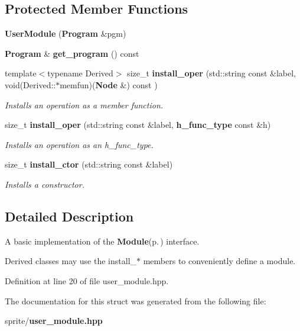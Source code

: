 \subsection*{Protected Member Functions}
\begin{CompactItemize}
\item 
{\bf User\-Module} ({\bf Program} \&pgm)\label{structsprite_1_1UserModule_b0}

\item 
{\bf Program} \& {\bf get\_\-program} () const \label{structsprite_1_1UserModule_b2}

\item 
template$<$typename Derived$>$ size\_\-t {\bf install\_\-oper} (std::string const \&label, void(Derived::$\ast$memfun)({\bf Node} \&) const )\label{structsprite_1_1UserModule_b3}

\begin{CompactList}\small\item\em Installs an operation as a member function. \item\end{CompactList}\item 
size\_\-t {\bf install\_\-oper} (std::string const \&label, {\bf h\_\-func\_\-type} const \&h)\label{structsprite_1_1UserModule_b4}

\begin{CompactList}\small\item\em Installs an operation as an h\_\-func\_\-type. \item\end{CompactList}\item 
size\_\-t {\bf install\_\-ctor} (std::string const \&label)\label{structsprite_1_1UserModule_b5}

\begin{CompactList}\small\item\em Installs a constructor. \item\end{CompactList}\end{CompactItemize}


\subsection{Detailed Description}
A basic implementation of the {\bf Module}{\rm (p.\,\pageref{structsprite_1_1Module})} interface. 

Derived classes may use the install\_\-$\ast$ members to conveniently define a module. 



Definition at line 20 of file user\_\-module.hpp.

The documentation for this struct was generated from the following file:\begin{CompactItemize}
\item 
sprite/{\bf user\_\-module.hpp}\end{CompactItemize}
